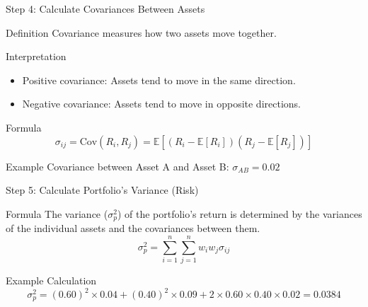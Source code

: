 \documentclass{beamer}
\begin{document}
\begin{frame}{Step 4: Calculate Covariances Between Assets}
    \begin{block}{Definition}
        Covariance measures how two assets move together.
    \end{block}
    \begin{block}{Interpretation}
        \begin{itemize}
            \item Positive covariance: Assets tend to move in the same direction.
            \item Negative covariance: Assets tend to move in opposite directions.
        \end{itemize}
    \end{block}
    \begin{block}{Formula}
        \begin{equation*}
            \sigma_{ij} = \text{Cov}(R_i, R_j) = \mathbb{E}[(R_i - \mathbb{E}[R_i])(R_j - \mathbb{E}[R_j])]
        \end{equation*}
    \end{block}
    \begin{block}{Example}
        Covariance between Asset A and Asset B: \(\sigma_{AB} = 0.02\)
    \end{block}
\end{frame}


\begin{frame}{Step 5: Calculate Portfolio's Variance (Risk)}
    \begin{block}{Formula}
        The variance (\(\sigma_p^2\)) of the portfolio's return is determined by the variances of the individual assets and the covariances between them.
        \begin{equation*}
            \sigma_p^2 = \sum_{i=1}^{n} \sum_{j=1}^{n} w_i w_j \sigma_{ij}
        \end{equation*}
    \end{block}
    \begin{block}{Example Calculation}
        \begin{equation*}
            \sigma_p^2 = (0.60)^2 \times 0.04 + (0.40)^2 \times 0.09 + 2 \times 0.60 \times 0.40 \times 0.02 = 0.0384
        \end{equation*}
    \end{block}
\end{frame}
\end{document}
